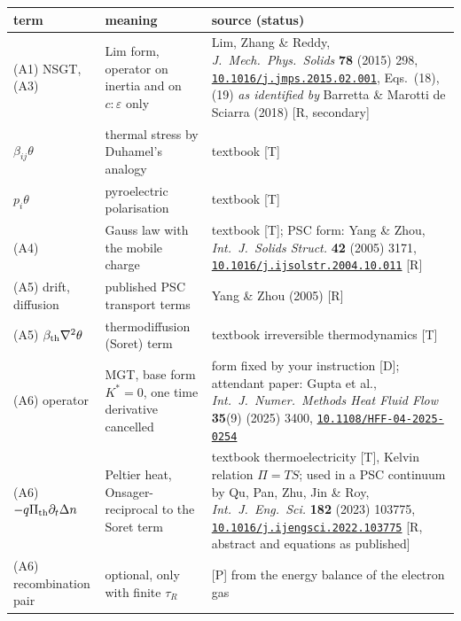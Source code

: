 \documentclass[11pt]{article}
\newcommand{\doi}[1]{\href{https://doi.org/#1}{\texttt{#1}}}
\begin{document}
\begin{center}\footnotesize
\begin{tabular}{p{2.6cm}p{6.0cm}p{5.2cm}}
\toprule
term & meaning & source (status)\\
\midrule
(A1) NSGT, (A3) & Lim form, operator on inertia and on $c{:}\varepsilon$ only & Lim, Zhang \& Reddy, \emph{J.\ Mech.\ Phys.\ Solids} \textbf{78} (2015) 298, \doi{10.1016/j.jmps.2015.02.001}, Eqs.~(18), (19) \emph{as identified by} Barretta \& Marotti de Sciarra (2018) [R, secondary]\\
$\beta_{ij}\theta$ & thermal stress by Duhamel's analogy & textbook [T]\\
$p_i\theta$ & pyroelectric polarisation & textbook [T]\\
(A4) & Gauss law with the mobile charge & textbook [T]; PSC form: Yang \& Zhou, \emph{Int.\ J.\ Solids Struct.} \textbf{42} (2005) 3171, \doi{10.1016/j.ijsolstr.2004.10.011} [R]\\
(A5) drift, diffusion & published PSC transport terms & Yang \& Zhou (2005) [R]\\
(A5) $\beta_{\rm th}\nabla^2\theta$ & thermodiffusion (Soret) term & textbook irreversible thermodynamics [T]\\
(A6) operator & MGT, base form $K^*=0$, one time derivative cancelled & form fixed by your instruction [D]; attendant paper: Gupta et al., \emph{Int.\ J.\ Numer.\ Methods Heat Fluid Flow} \textbf{35}(9) (2025) 3400, \doi{10.1108/HFF-04-2025-0254}\\
(A6) $-q\Pi_{\rm th}\partial_t\Delta n$ & Peltier heat, Onsager-reciprocal to the Soret term & textbook thermoelectricity [T], Kelvin relation $\Pi=TS$; used in a PSC continuum by Qu, Pan, Zhu, Jin \& Roy, \emph{Int.\ J.\ Eng.\ Sci.} \textbf{182} (2023) 103775, \doi{10.1016/j.ijengsci.2022.103775} [R, abstract and equations as published]\\
(A6) recombination pair & optional, only with finite $\tau_R$ & [P] from the energy balance of the electron gas\\
\bottomrule
\end{tabular}
\end{center}
\end{document}
